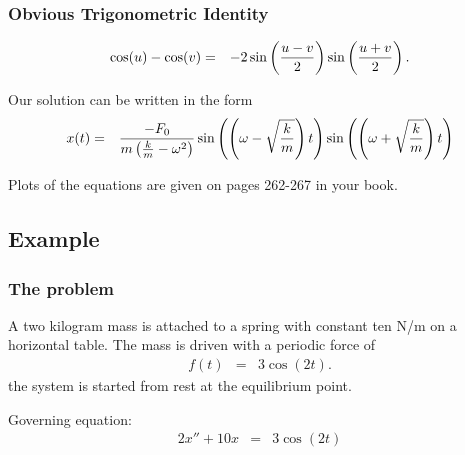\begin{frame}
  \frametitle{Obvious Trigonometric Identity}

  \begin{eqnarray*}
    \cos(u) - \cos(v) & = & -2 \sin\left(\frac{u-v}{2}\right) \sin\left(\frac{u+v}{2}\right).
  \end{eqnarray*}

  Our solution can be written in the form
  \begin{eqnarray*}
    x(t) & = & \frac{-F_0}{m\left(\frac{k}{m}-\omega^2\right)} \sin\left(\left(\omega-\sqrt{\frac{k}{m}}\right) t\right)
                                                        \sin\left(\left(\omega+\sqrt{\frac{k}{m}}\right) t\right)
  \end{eqnarray*}

  Plots of the equations are given on pages 262-267 in your book.

\end{frame}

\subsection{Example}

\begin{frame}                   
  \frametitle{The problem}      
                                
  A two kilogram mass is attached to a spring with constant ten N/m on
  a horizontal table. The mass is driven with a periodic force of
  \begin{eqnarray*}
    f(t) & = & 3 \cos(2t).
  \end{eqnarray*}
  the system is started from rest at the equilibrium point.

  Governing equation:
  \begin{eqnarray*}
    2 x'' + 10 x & = & 3 \cos(2t)
  \end{eqnarray*}

\end{frame}


